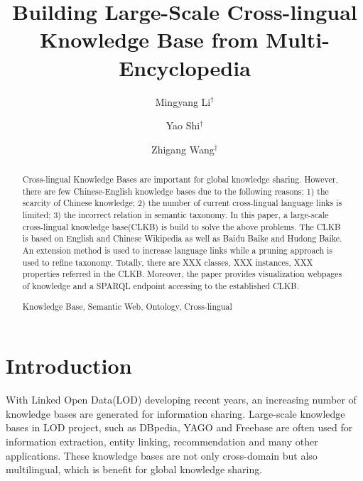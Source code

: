 \documentclass[runningheads,a4paper]{llncs}
\newcommand{\keywords}[1]{\par\addvspace\baselineskip\noindent\keywordname\enspace\ignorespaces#1}
\begin{document}
\mainmatter

\title{Building Large-Scale Cross-lingual Knowledge Base from Multi-Encyclopedia}
\author{Mingyang Li$^\dag$ \and Yao Shi$^\dag$ \and Zhigang Wang$^\dag$}


\maketitle

\begin{abstract}
Cross-lingual Knowledge Bases are important for global knowledge sharing. However, there are few Chinese-English knowledge bases due to the following reasons: 1) the scarcity of Chinese knowledge; 2) the number of current cross-lingual language links is limited; 3) the incorrect relation in semantic taxonomy. In this paper, a large-scale cross-lingual knowledge base(CLKB) is build to solve the above problems. The CLKB is based on English and Chinese Wikipedia as well as Baidu Baike and Hudong Baike. An extension method is used to increase language links while a pruning approach is used to refine taxonomy. Totally, there are XXX classes, XXX instances, XXX properties referred in the CLKB. Moreover, the paper provides visualization webpages of knowledge and a SPARQL endpoint accessing to the established CLKB.  

\keywords{Knowledge Base, Semantic Web, Ontology, Cross-lingual}
\end{abstract}

\section{Introduction}
With Linked Open Data(LOD) developing recent years, an increasing number of knowledge bases are generated for information sharing. Large-scale knowledge bases in LOD project, such as DBpedia\cite{mendes2012dbpedia}, YAGO\cite{mahdisoltani2014yago3} and Freebase\cite{bollacker2008freebase} are often used for information extraction\cite{dutta2013integrating}, entity linking\cite{shen2012linden}, recommendation\cite{passant2010dbrec,fernandez2011generic,kaminskas2012knowledge} and many other applications. These knowledge bases are not only cross-domain but also multilingual, which is benefit for global knowledge sharing.  
\end{document}
